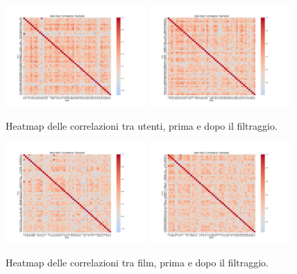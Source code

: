 \begin{figure}[H]
    \centering
    \includegraphics[width=0.48\textwidth]{../output/eda/before_cut/before_user_correlation_heatmap.png}
    \includegraphics[width=0.48\textwidth]{../output/eda/after_cut/after_user_correlation_heatmap.png}
    \caption{Heatmap delle correlazioni tra utenti, prima e dopo il filtraggio.}
\end{figure}

\begin{figure}[H]
    \centering
    \includegraphics[width=0.48\textwidth]{../output/eda/before_cut/before_item_correlation_heatmap.png}
    \includegraphics[width=0.48\textwidth]{../output/eda/after_cut/after_item_correlation_heatmap.png}
    \caption{Heatmap delle correlazioni tra film, prima e dopo il filtraggio.}
\end{figure}


